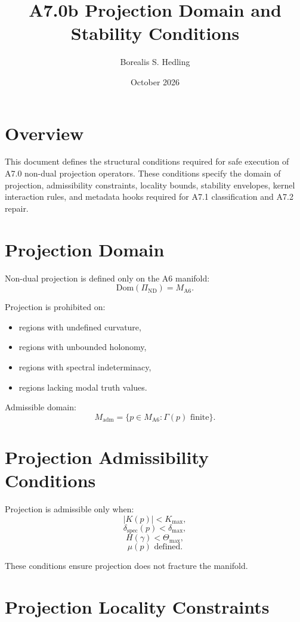 \documentclass[11pt]{article}
\title{A7.0b Projection Domain and Stability Conditions}
\author{Borealis S. Hedling}
\date{October 2026}
\begin{document}
\maketitle

\section*{Overview}

This document defines the structural conditions required for safe execution
of A7.0 non-dual projection operators. These conditions specify the domain
of projection, admissibility constraints, locality bounds, stability envelopes,
kernel interaction rules, and metadata hooks required for A7.1 classification
and A7.2 repair.

\section{Projection Domain}

Non-dual projection is defined only on the A6 manifold:
\[
\mathrm{Dom}(\Pi_{\mathrm{ND}}) = M_{\mathrm{A6}}.
\]

Projection is prohibited on:
\begin{itemize}
  \item regions with undefined curvature,
  \item regions with unbounded holonomy,
  \item regions with spectral indeterminacy,
  \item regions lacking modal truth values.
\end{itemize}

Admissible domain:
\[
M_{\mathrm{adm}} = \{ p \in M_{\mathrm{A6}} : \Gamma(p) \text{ finite} \}.
\]

\section{Projection Admissibility Conditions}

Projection is admissible only when:
\[
|K(p)| < K_{\max},
\]
\[
\delta_{\mathrm{spec}}(p) < \delta_{\max},
\]
\[
H(\gamma) < \Theta_{\max},
\]
\[
\mu(p) \text{ defined}.
\]

These conditions ensure projection does not fracture the manifold.

\section{Projection Locality Constraints}
\end{document}
